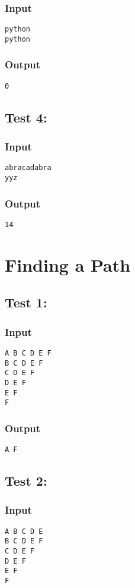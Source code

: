 \documentclass[twocolumn]{extarticle}
\begin{document}
\subsubsection*{Input}
\texttt{python\\
python}

\subsubsection*{Output}
\texttt{0}

\subsection*{Test 4:}
\subsubsection*{Input}
\texttt{abracadabra\\
yyz}

\subsubsection*{Output}
\texttt{14}

\newpage
\section{Finding a Path}
\subsection*{Test 1:}
\subsubsection*{Input}
\texttt{A B C D E F\\
B C D E F\\
C D E F\\
D E F\\
E F\\
F}

\subsubsection*{Output}
\texttt{A F}

\subsection*{Test 2:}
\subsubsection*{Input}
\texttt{A B C D E\\
B C D E F\\
C D E F\\
D E F\\
E F\\
F}
\end{document}
